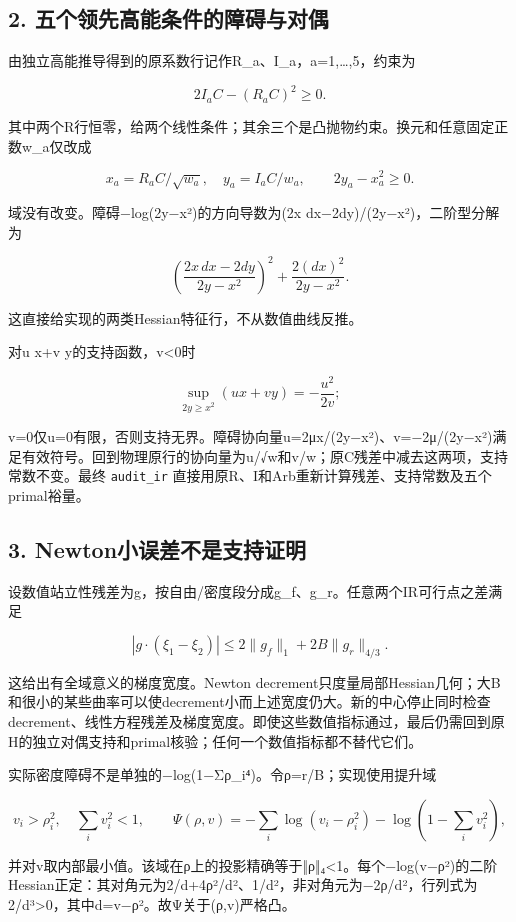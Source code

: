 \documentclass[
  10pt,
  a4paper,
]{article}
\begin{document}
\subsection{2.
五个领先高能条件的障碍与对偶}\label{ux4e94ux4e2aux9886ux5148ux9ad8ux80fdux6761ux4ef6ux7684ux969cux788dux4e0eux5bf9ux5076}

由独立高能推导得到的原系数行记作R\_a、I\_a，a=1,\ldots,5，约束为

\[
2I_aC-(R_aC)^2\ge0.
\]

其中两个R行恒零，给两个线性条件；其余三个是凸抛物约束。换元和任意固定正数w\_a仅改成

\[
x_a=R_aC/\sqrt{w_a},\quad y_a=I_aC/w_a,
\qquad 2y_a-x_a^2\ge0.
\]

域没有改变。障碍−log(2y−x²)的方向导数为(2x dx−2dy)/(2y−x²)，二阶型分解为

\[
\left(\frac{2x\,dx-2dy}{2y-x^2}\right)^2
+\frac{2(dx)^2}{2y-x^2}.
\]

这直接给实现的两类Hessian特征行，不从数值曲线反推。

对u x+v y的支持函数，v\textless0时

\[
\sup_{2y\ge x^2}(ux+vy)=-\frac{u^2}{2v};
\]

v=0仅u=0有限，否则支持无界。障碍协向量u=2μx/(2y−x²)、v=−2μ/(2y−x²)满足有效符号。回到物理原行的协向量为u/√w和v/w；原C残差中减去这两项，支持常数不变。最终
\texttt{audit\_ir}
直接用原R、I和Arb重新计算残差、支持常数及五个primal裕量。

\subsection{3.
Newton小误差不是支持证明}\label{newtonux5c0fux8befux5deeux4e0dux662fux652fux6301ux8bc1ux660e}

设数值站立性残差为g，按自由/密度段分成g\_f、g\_r。任意两个IR可行点之差满足

\[
|g\cdot(\xi_1-\xi_2)|
\le2\|g_f\|_1+2B\|g_r\|_{4/3}.
\]

这给出有全域意义的梯度宽度。Newton
decrement只度量局部Hessian几何；大B和很小的某些曲率可以使decrement小而上述宽度仍大。新的中心停止同时检查decrement、线性方程残差及梯度宽度。即使这些数值指标通过，最后仍需回到原H的独立对偶支持和primal核验；任何一个数值指标都不替代它们。

实际密度障碍不是单独的−log(1−Σρ\_i⁴)。令ρ=r/B；实现使用提升域

\[
 v_i>\rho_i^2,\quad \sum_i v_i^2<1,\qquad
 \Psi(\rho,v)=-\sum_i\log(v_i-\rho_i^2)-\log(1-\sum_i v_i^2),
\]

并对v取内部最小值。该域在ρ上的投影精确等于‖ρ‖₄\textless1。每个−log(v−ρ²)的二阶Hessian正定：其对角元为2/d+4ρ²/d²、1/d²，非对角元为−2ρ/d²，行列式为2/d³\textgreater0，其中d=v−ρ²。故Ψ关于(ρ,v)严格凸。
\end{document}
